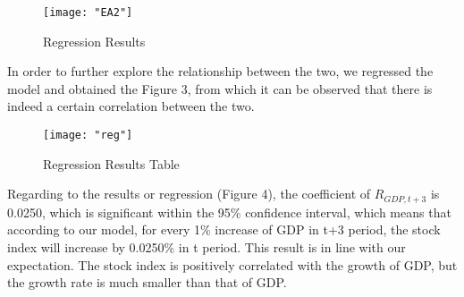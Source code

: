 \documentclass[../main.tex]{subfiles}
\begin{document}
\begin{figure}[htp]
\centering
\texttt{[image: "EA2"]}
\caption{Regression Results}
\label{regression}
\end{figure}

In order to further explore the relationship between the two, we regressed the model and obtained the Figure 3, from which it can be observed that there is indeed a certain correlation between the two.

\begin{figure}[htp]
\centering
\texttt{[image: "reg"]}
\caption{Regression Results Table}
\label{regression table}
\end{figure}

Regarding to the results or regression (Figure 4), the coefficient of $R_{GDP,t+3}$ is 0.0250, which is significant within the 95\% confidence interval, which means that according to our model, for every 1\% increase of GDP in t+3 period, the stock index will increase by 0.0250\% in t period. This result is in line with our expectation. The stock index is positively correlated with the growth of GDP, but the growth rate is much smaller than that of GDP.
\end{document}
